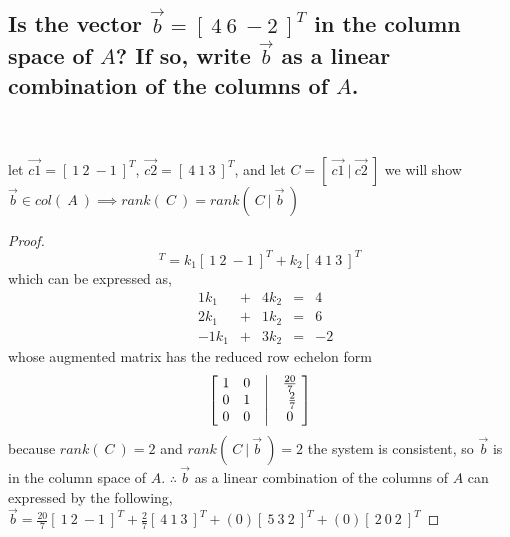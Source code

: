 \documentclass[../main.tex]{subfiles}
\begin{document}
\subsection{Is the vector $\vec{b} = [ \ 4 \ 6 \ -2 \ ]^T$ in the column space of $A$? If so, write $\vec{b}$ as a linear combination of the columns of $A$.}
\\\\let $\vec{c1} = [\ 1 \ 2 \ -1\ ]^T$, $\vec{c2} = [\ 4 \ 1 \ 3\ ]^T$, and let $C = [\ \vec{c1}\ |\ \vec{c2}\ ]$ we will show $\vec{b} \in col(\ A\ )\implies rank(\ C\ ) = rank(\ C\ |\ \vec{b}\ )$
\begin{proof}
        \begin{equation*}
                [ \ 4 \ 6 \ -2 \ ]^T = k_1[\ 1 \ 2 \ -1\ ]^T + k_2[\ 4 \ 1 \ 3\ ]^T
        \end{equation*}
        which can be expressed as,
        $$
                \begin{matrix}
                         & 1k_{1}  & + & 4k_{2} & = & 4  \\
                         & 2k_{1}  & + & 1k_{2} & = & 6  \\
                         & -1k_{1} & + & 3k_{2} & = & -2
                \end{matrix}
        $$
        whose augmented matrix has the reduced row echelon form
        \begin{align*}
                \begin{bmatrix}
                        \ 1 & 0 & \bigm| & \frac{20}{7}\ \\
                        \ 0 & 1 & \bigm| & \frac{2}{7}   \\
                        \ 0 & 0 & \bigm| & 0\
                \end{bmatrix}
        \end{align*}
        because $rank(\ C\ ) = 2$ and $rank(\ C\ |\ \vec{b}\ ) = 2$ the system is consistent, so $\vec{b}$ is in the column space of $A$.
        $\therefore\ \vec{b}$ as a linear combination of the columns of $A$ can expressed by the following,
        \\$\vec{b} = \frac{20}{7}[\ 1 \ 2 \ -1\ ]^T + \frac{2}{7}[\ 4 \ 1 \ 3\ ]^T + (0)[\ 5\ 3\ 2\ ]^T + (0)[\ 2\ 0\ 2\ ]^T$
\end{proof}
\end{document}
